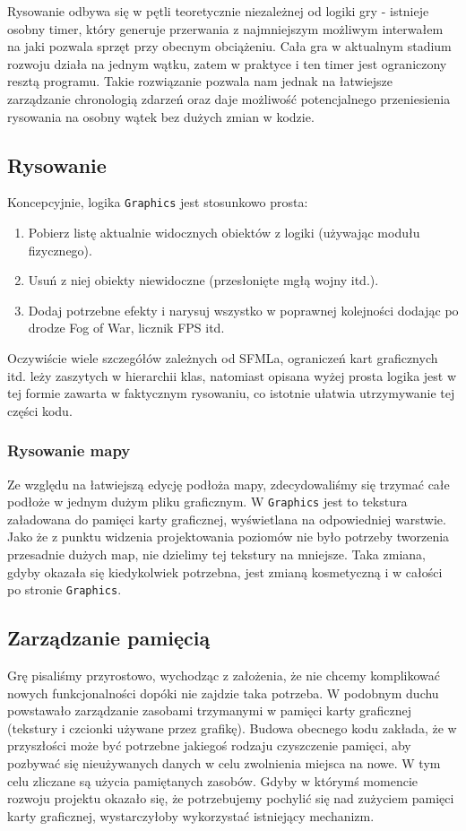 \documentclass[licencjacka]{pracamgr}
\begin{document}
      Rysowanie odbywa się w pętli teoretycznie niezależnej od logiki gry - istnieje osobny timer, który generuje
      przerwania z najmniejszym możliwym interwałem na jaki pozwala sprzęt przy obecnym obciążeniu. Cała gra w aktualnym
      stadium rozwoju działa na jednym wątku, zatem w praktyce i ten timer jest ograniczony resztą programu. Takie
      rozwiązanie pozwala nam jednak na łatwiejsze zarządzanie chronologią zdarzeń oraz daje możliwość potencjalnego
      przeniesienia rysowania na osobny wątek bez dużych zmian w kodzie.

    \subsection{Rysowanie}
      Koncepcyjnie, logika \texttt{Graphics} jest stosunkowo prosta:
      \begin{enumerate}
       \item Pobierz listę aktualnie widocznych obiektów z logiki (używając modułu fizycznego).
       \item Usuń z niej obiekty niewidoczne (przesłonięte mgłą wojny itd.).
       \item Dodaj potrzebne efekty i narysuj wszystko w poprawnej kolejności dodając po drodze Fog of War, licznik FPS
	  itd.
      \end{enumerate}
      Oczywiście wiele szczegółów zależnych od SFMLa, ograniczeń kart graficznych itd. leży zaszytych w hierarchii klas,
      natomiast opisana wyżej prosta logika jest w tej formie zawarta w faktycznym rysowaniu, co istotnie ułatwia
      utrzymywanie tej części kodu.

    \subsubsection{Rysowanie mapy}
      Ze względu na łatwiejszą edycję podłoża mapy, zdecydowaliśmy się trzymać całe podłoże w jednym dużym pliku
      graficznym. W \texttt{Graphics} jest to tekstura załadowana do pamięci karty graficznej, wyświetlana na odpowiedniej
      warstwie. Jako że z punktu widzenia projektowania poziomów nie było potrzeby tworzenia przesadnie dużych map,
      nie dzielimy tej tekstury na mniejsze. Taka zmiana, gdyby okazała się kiedykolwiek potrzebna, jest zmianą
      kosmetyczną i w całości po stronie \texttt{Graphics}.

    \subsection{Zarządzanie pamięcią}
      Grę pisaliśmy przyrostowo, wychodząc z założenia, że nie chcemy komplikować nowych funkcjonalności dopóki nie
      zajdzie taka potrzeba. W podobnym duchu powstawało zarządzanie zasobami trzymanymi w pamięci karty graficznej
      (tekstury i czcionki używane przez grafikę). Budowa obecnego kodu zakłada, że w przyszłości może być potrzebne
      jakiegoś rodzaju czyszczenie pamięci, aby pozbywać się nieużywanych danych w celu zwolnienia miejsca na nowe.
      W tym celu zliczane są użycia pamiętanych zasobów. Gdyby w którymś momencie rozwoju projektu okazało się, że
      potrzebujemy pochylić się nad zużyciem pamięci karty graficznej, wystarczyłoby wykorzystać istniejący mechanizm.
\end{document}
